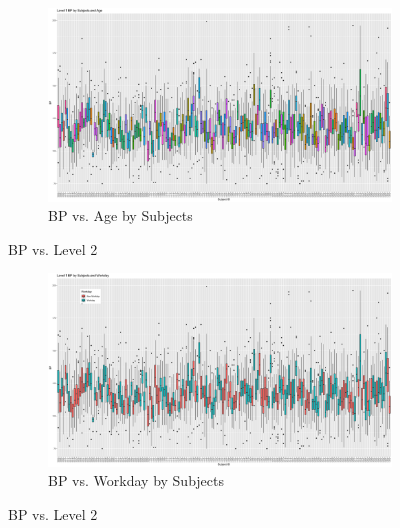 \documentclass[12pt,twoside,letterpaper]{article}
\theoremstyle{definition}
\theoremstyle{definition}
\begin{document}
\begin{appendices}
    \begin{figure}[h] 
        \centering
        \begin{subfigure}[b]{\textwidth}
            \centering
            \includegraphics[width=\textwidth]{pics/bp by id and age.png}
            \caption{BP vs. Age by Subjects}
            \label{fig: bp v id and age}
        \end{subfigure}
        \caption{BP vs. Level 2}
        \label{fig: bp v id and level2_1}
    \end{figure}

    \begin{figure}[h] \ContinuedFloat
        \centering
        \begin{subfigure}[b]{\textwidth}
            \centering
            \includegraphics[width=\textwidth]{pics/bp by id and day.png}
            \caption{BP vs. Workday by Subjects}
            \label{fig: bp v id and day}
        \end{subfigure}
        \caption{BP vs. Level 2}
        \label{fig: bp v id and level2_2}
    \end{figure}


\end{appendices}
\end{document}
